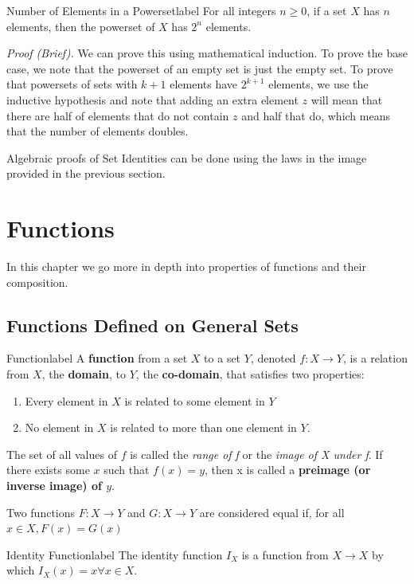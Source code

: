 \documentclass[a4paper]{report}
\begin{document}
\begin{theorem}{Number of Elements in a Powerset}{label}
    For all integers $n \ge 0$, if a set $X$ has $n$ elements, then the powerset of $X$ has $2^n$ elements.
\end{theorem}

\emph{Proof (Brief).} We can prove this using mathematical induction. To prove the base case, we note that
the powerset of an empty set is just the empty set. To prove that powersets of sets with $k+1$ elements have
$2^{k+1}$ elements, we use the inductive hypothesis and note that adding an extra element $z$ will mean that
there are half of elements that do not contain $z$ and half that do, which means that the number of elements
doubles.

Algebraic proofs of Set Identities can be done using the laws in the image provided in the previous section.

\chapter{Functions}

In this chapter we go more in depth into properties of functions and their composition.

\section{Functions Defined on General Sets}

\begin{definition}{Function}{label}
    A \textbf{function} from a set $X$ to a set $Y$, denoted $f: X \to Y$, is a relation from
    $X$, the \textbf{domain}, to $Y$, the \textbf{co-domain}, that satisfies two properties:
    \begin{enumerate}
        \item Every element in $X$ is related to some element in $Y$
        \item No element in $X$ is related to more than one element in $Y$.
    \end{enumerate}
    The set of all values of $f$ is called the \emph{range of f} or the \emph{image of X under f}.
    If there exists some $x$ such that $f(x)=y$, then x is called a \textbf{preimage 
    (or inverse image) of $y$}.

    Two functions $F: X \to Y$ and $G: X \to Y$ are considered equal if, for all $x \in X, F(x) = G(x)$
\end{definition}

\begin{definition}{Identity Function}{label}
    The identity function $I_X$ is a function from $X \to X$ by which $I_X(x) = x \forall x \in X$.
\end{definition}
\end{document}
